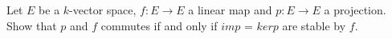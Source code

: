 Let $E$ be a $k$-vector space, $f: E \to E$ a linear map and $p: E \to E$ a projection. Show that $p$ and $f$ commutes if and only if $im p$ = $ker p$ are stable by $f$.

